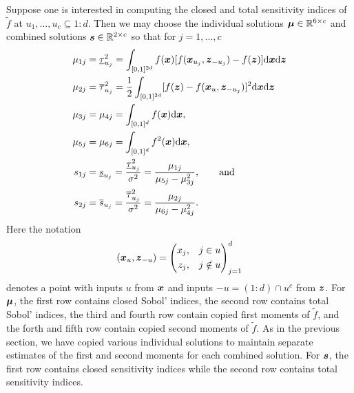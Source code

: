 \documentclass{article}[12pt]
\begin{document}
Suppose one is interested in computing the closed and total sensitivity indices of $\tilde{f}$ at $u_1,\dots,u_c \subseteq 1:d$.  Then we may choose the individual solutions $\boldsymbol{\mu} \in \mathbb{R}^{6 \times c}$ and combined solutions $\boldsymbol{s} \in \mathbb{R}^{2 \times c}$ so that for $j=1,\dots,c$
\begin{align*}
    \mu_{1j} &= \underline{\tau}_{u_j}^2 = \int_{[0,1]^{2d}} f(\boldsymbol{x})[f(\boldsymbol{x}_{u_j},\boldsymbol{z}_{-{u_j}})-f(\boldsymbol{z})]\mathrm{d}\boldsymbol{x}\mathrm{d}\boldsymbol{z} \\
    \mu_{2j} &= \overline{\tau}_{u_j}^2 = \frac{1}{2}\int_{[0,1]^{2d}} [f(\boldsymbol{z})-f(\boldsymbol{x}_u,\boldsymbol{z}_{-{u_j}})]^2\mathrm{d}\boldsymbol{x}\mathrm{d}\boldsymbol{z} \\
    \mu_{3j} &= \mu_{4j} = \int_{[0,1]^{d}} f(\boldsymbol{x})\mathrm{d}\boldsymbol{x}, \\
    \mu_{5j} &= \mu_{6j} = \int_{[0,1]^{d}} f^2(\boldsymbol{x})\mathrm{d}\boldsymbol{x}, \\
    s_{1j} &= \underline{s}_{u_j} = \frac{\underline{\tau}_{u_j}^2}{\sigma^2} = \frac{\mu_{1j}}{\mu_{5j}-\mu_{3j}^2}, \qquad \text{and} \\
    s_{2j} &= \overline{s}_{u_j} = \frac{\overline{\tau}_{u_j}^2}{\sigma^2} = \frac{\mu_{2j}}{\mu_{6j}-\mu_{4j}^2}.  
\end{align*}
Here the notation
\begin{equation}
    (\boldsymbol{x}_{u},\boldsymbol{z}_{-u}) = \left(\begin{aligned}x_{j}, \quad & j \in u \\ z_{j}, \quad & j \notin u \end{aligned}\right)_{j=1}^{d}
\end{equation}
denotes a point with inputs $u$ from $\boldsymbol{x}$ and inputs $-u=(1:d)\cap u^c$ from $\boldsymbol{z}$.
For $\boldsymbol{\mu}$, the first row contains closed Sobol' indices, the second row contains total Sobol' indices, the third and fourth row contain copied first moments of $\tilde{f}$, and the forth and fifth row contain copied second moments of $\tilde{f}$. As in the previous section, we have copied various individual solutions to maintain separate estimates of the first and second moments for each combined solution. For $\boldsymbol{s}$, the first row contains closed sensitivity indices while the second row contains total sensitivity indices. 
\end{document}
